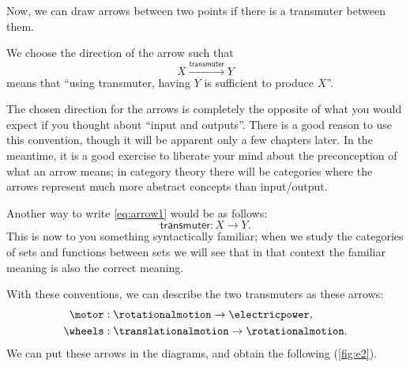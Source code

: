 Now, we can draw arrows between two points if there is a transmuter between them.

We choose the direction of the arrow such that
\begin{equation}
\label{eq:arrow1}
    X \stackrel{\textsf{transmuter}}{\longrightarrow} Y 
\end{equation}
means that ``using \textsf{transmuter}, having $Y$ is sufficient to produce $X$''. 

\begin{remark}
The chosen direction
for the arrows is completely the opposite of what you would expect if you thought about
``input and outputs''. There is a good reason to use this convention, though it will
be apparent only a few chapters later. In the meantime, it is a good exercise
to liberate your mind about the preconception of what an arrow means; in category theory
there will be categories where the arrows represent much more abstract concepts than input/output.
\end{remark}

Another way to write \cref{eq:arrow1} would be as follows:
\begin{equation}
    \textsf{transmuter}\colon X \to Y.
\end{equation}
This is now to you something syntactically familiar; when we study the categories of sets and functions between sets we will see that in that context the familiar meaning is also the correct meaning.

With these conventions, we can describe the two transmuters as these arrows:
% 
\begin{align}
    \motor&:  \rotationalmotion \rightarrow \electricpower, \\
    \wheels&: \translationalmotion \rightarrow \rotationalmotion.
\end{align}
% 
We can put these arrows in the diagrams, and obtain 
the following (\cref{fig:e2}).





